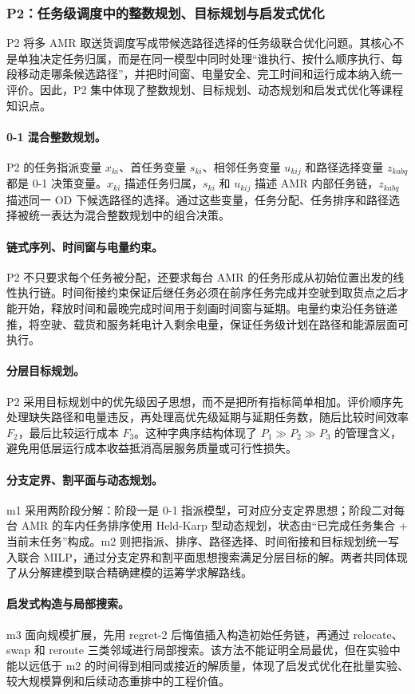 \subsubsection{P2：任务级调度中的整数规划、目标规划与启发式优化}

P2 将多 AMR 取送货调度写成带候选路径选择的任务级联合优化问题。其核心不是单独决定任务归属，而是在同一模型中同时处理“谁执行、按什么顺序执行、每段移动走哪条候选路径”，并把时间窗、电量安全、完工时间和运行成本纳入统一评价。因此，P2 集中体现了整数规划、目标规划、动态规划和启发式优化等课程知识点。

\paragraph{0-1 混合整数规划。}
P2 的任务指派变量 $x_{ki}$、首任务变量 $s_{ki}$、相邻任务变量 $u_{kij}$ 和路径选择变量 $z_{kabq}$ 都是 0-1 决策变量。$x_{ki}$ 描述任务归属，$s_{ki}$ 和 $u_{kij}$ 描述 AMR 内部任务链，$z_{kabq}$ 描述同一 OD 下候选路径的选择。通过这些变量，任务分配、任务排序和路径选择被统一表达为混合整数规划中的组合决策。

\paragraph{链式序列、时间窗与电量约束。}
P2 不只要求每个任务被分配，还要求每台 AMR 的任务形成从初始位置出发的线性执行链。时间衔接约束保证后继任务必须在前序任务完成并空驶到取货点之后才能开始，释放时间和最晚完成时间用于刻画时间窗与延期。电量约束沿任务链递推，将空驶、载货和服务耗电计入剩余电量，保证任务级计划在路径和能源层面可执行。

\paragraph{分层目标规划。}
P2 采用目标规划中的优先级因子思想，而不是把所有指标简单相加。评价顺序先处理缺失路径和电量违反，再处理高优先级延期与延期任务数，随后比较时间效率 $F_2$，最后比较运行成本 $F_3$。这种字典序结构体现了 $P_1\gg P_2\gg P_3$ 的管理含义，避免用低层运行成本收益抵消高层服务质量或可行性损失。

\paragraph{分支定界、割平面与动态规划。}
m1 采用两阶段分解：阶段一是 0-1 指派模型，可对应分支定界思想；阶段二对每台 AMR 的车内任务排序使用 Held-Karp 型动态规划，状态由“已完成任务集合 + 当前末任务”构成。m2 则把指派、排序、路径选择、时间衔接和目标规划统一写入联合 MILP，通过分支定界和割平面思想搜索满足分层目标的解。两者共同体现了从分解建模到联合精确建模的运筹学求解路线。

\paragraph{启发式构造与局部搜索。}
m3 面向规模扩展，先用 regret-2 后悔值插入构造初始任务链，再通过 relocate、swap 和 reroute 三类邻域进行局部搜索。该方法不能证明全局最优，但在实验中能以远低于 m2 的时间得到相同或接近的解质量，体现了启发式优化在批量实验、较大规模算例和后续动态重排中的工程价值。